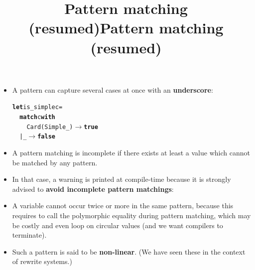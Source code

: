 \documentclass[wide]{slides}
\begin{document}
\begin{slide}
  \title{Pattern matching (resumed)}

  \begin{itemize}

    \item A pattern can capture several cases at once with an
      \textbf{underscore}:
\begin{alltt}
\textbf{let} is\_simple c =
\ \ \textbf{match} c \textbf{with}
\ \ \ \ Card (Simple \_) \(\rightarrow\) \textbf{true}
\ \ | \_ \(\rightarrow\) \textbf{false}
\end{alltt}

    \item A pattern matching is incomplete if there exists at least a
      value which cannot be matched by any pattern.

    \item In that case, a warning is printed at compile\hyp{}time
      because it is strongly advised to \textbf{avoid incomplete
        pattern matchings}:
      \medskip

      \noindent{}

      \noindent{}

      \noindent{}

      \noindent{}

      \noindent{}

  \end{itemize}

\end{slide}

\begin{slide}
  \title{Pattern matching (resumed)}

  \begin{itemize}

    \item A variable cannot occur twice or more in the same pattern,
      because this requires to call the polymorphic equality during
      pattern matching, which may be costly and even loop on circular
      values (and we want compilers to terminate).

    \item Such a pattern is said to be \textbf{non\hyp{}linear}. (We
      have seen these in the context of rewrite systems.)
      \medskip

      \noindent{}

      \noindent{}

      \noindent{}

  \end{itemize}

\end{slide}
\end{document}
